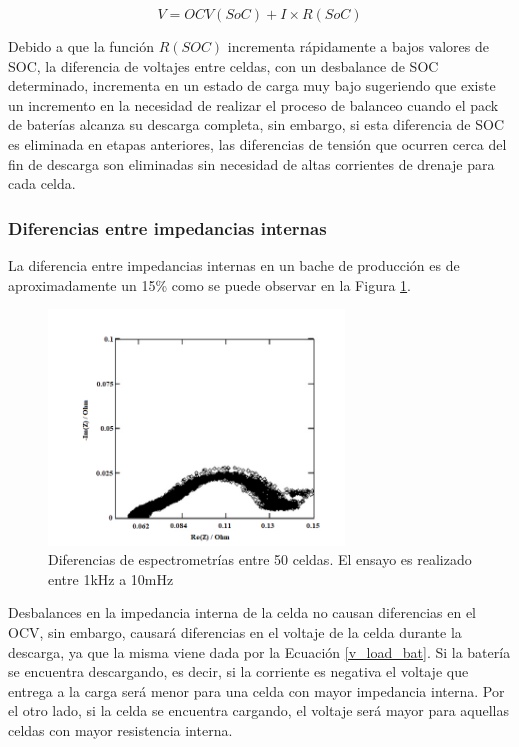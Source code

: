 \documentclass[10pt,a4paper]{article}
\begin{document}
\begin{equation}
    V = OCV(SoC) + I \times R(SoC)
    \label{v_load_bat}
\end{equation}

\noindent Debido a que la función $R(SOC)$ incrementa rápidamente a bajos
valores de SOC, la diferencia de voltajes entre celdas, con un desbalance de SOC
determinado, incrementa en un estado de carga muy bajo sugeriendo que existe un
incremento en la necesidad de realizar el proceso de balanceo cuando el pack de
baterías alcanza su descarga completa, sin embargo, si esta diferencia de SOC es
eliminada en etapas anteriores, las diferencias de tensión que ocurren cerca del
fin de descarga son eliminadas sin necesidad de altas corrientes de drenaje para
cada celda.

\subsubsection{Diferencias entre impedancias internas}

La diferencia entre impedancias internas en un bache de producción es de
aproximadamente un 15\% como se puede observar en la Figura \ref{zin_diff}.

\begin{figure}[h!]
    \begin{center}
	\includegraphics[width=0.7\textwidth]{zin_diff.png}
	\caption{Diferencias de espectrometrías entre 50 celdas. 
	El ensayo es realizado entre 1kHz a 10mHz}
	\label{zin_diff}
    \end{center}
\end{figure}
\FloatBarrier

Desbalances en la impedancia interna de la celda no causan diferencias en el
OCV, sin embargo, causará diferencias en el voltaje de la celda durante la
descarga, ya que la misma viene dada por la Ecuación \ref{v_load_bat}. Si la
batería se encuentra descargando, es decir, si la corriente es negativa el
voltaje que entrega a la carga será menor para una celda con mayor impedancia
interna. Por el otro lado, si la celda se encuentra cargando, el voltaje será
mayor para aquellas celdas con mayor resistencia interna.
\end{document}

